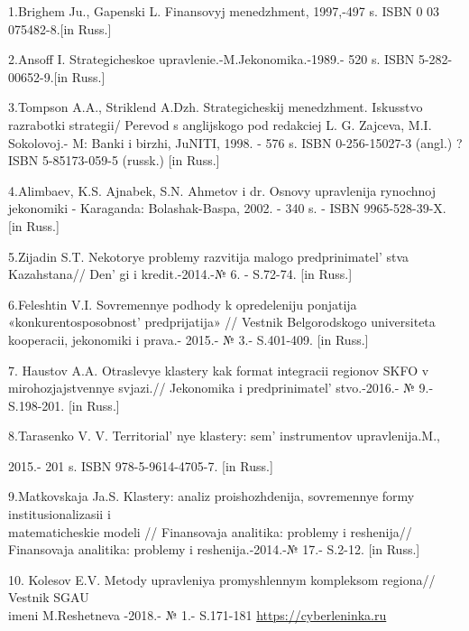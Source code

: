 \begin{references}

1.Brighem Ju., Gapenski L. Finansovyj menedzhment, 1997,-497 s. ISBN 0
03 075482-8.{[}in Russ.{]}

2.Ansoff I. Strategicheskoe upravlenie.-M.Jekonomika.-1989.- 520 s. ISBN
5-282-00652-9.{[}in Russ.{]}

3.Tompson A.A., Striklend A.Dzh. Strategicheskij menedzhment. Iskusstvo
razrabotki strategii/ Perevod s anglijskogo pod redakciej L. G. Zajceva,
M.I. Sokolovoj.- M: Banki i birzhi, JuNITI, 1998. - 576 s. ISBN
0-256-15027-3 (angl.) ?ISBN 5-85173-059-5 (russk.) {[}in Russ.{]}

4.Alimbaev, K.S. Ajnabek, S.N. Ahmetov i dr. Osnovy upravlenija
rynochnoj jekonomiki - Karaganda: Bolashak-Baspa, 2002. - 340 s. - ISBN
9965-528-39-X. {[}in Russ.{]}

5.Zijadin S.T. Nekotorye problemy razvitija malogo
predprinimatel' stva Kazahstana// Den' gi
i kredit.-2014.-№ 6. - S.72-74. {[}in Russ.{]}

6.Feleshtin V.I. Sovremennye podhody k opredeleniju ponjatija
«konkurentosposobnost'{} predprijatija» // Vestnik
Belgorodskogo universiteta kooperacii, jekonomiki i prava.- 2015.- № 3.-
S.401-409. {[}in Russ.{]}

7. Haustov A.A. Otraslevye klastery kak format integracii regionov SKFO
v mirohozjajstvennye svjazi.// Jekonomika i
predprinimatel' stvo.-2016.- № 9.- S.198-201. {[}in
Russ.{]}

8.Tarasenko V. V. Territorial' nye klastery:
sem'{} instrumentov upravlenija.M.,

2015.- 201 s. ISBN 978-5-9614-4705-7. {[}in Russ.{]}

9.Matkovskaja Ja.S. Klastery: analiz proishozhdenija, sovremennye formy
institusionalizasii i \\matematicheskie modeli // Finansovaja analitika:
problemy i reshenija// Finansovaja analitika: problemy i
reshenija.-2014.-№ 17.- S.2-12. {[}in Russ.{]}

10. Kolesov E.V. Metody upravleniya promyshlennym kompleksom regiona//
Vestnik SGAU \\imeni M.Reshetneva -2018.- № 1.- S.171-181 \href{https://cyberleninka.ru/article/n/metody-upravleniya-promyshlennym-kompleksom-regiona}{https://cyberleninka.ru}
\end{references}

